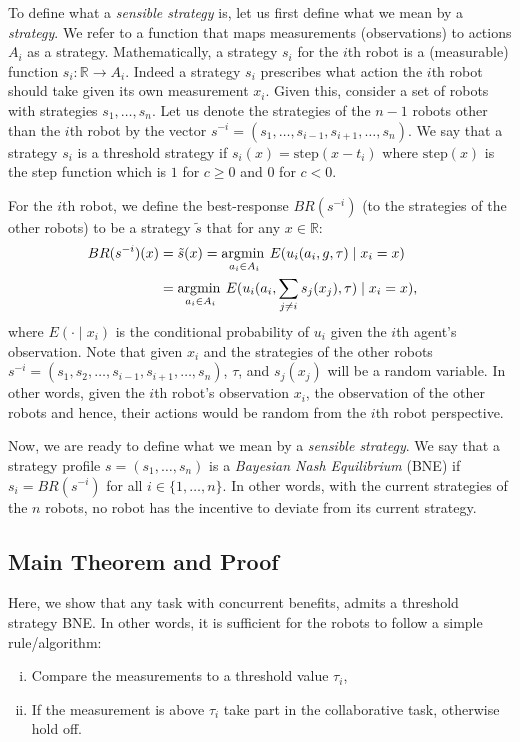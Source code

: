 \documentclass[conference]{ieeeconf}
\DeclareMathOperator*{\argmax}{\arg\!\min\>}
\def\R{\mathbb{R}}
\begin{document}
To define what a \textit{sensible strategy} is, let us first define what we mean by a \textit{strategy}. We refer to a function that maps measurements (observations) to actions $A_i$ as a strategy. Mathematically, a strategy $s_i$ for the $i$th robot is a (measurable) function $s_i:\R\to A_i$. Indeed a strategy $s_i$ prescribes what action the $i$th robot should take given its own measurement $x_i$. Given this, consider a set of robots with strategies $s_1,\ldots,s_n$. Let us denote the strategies of the $n-1$ robots other than the $i$th robot by the vector $s^{-i}=(s_1,\ldots,s_{i-1},s_{i+1},\ldots,s_n)$.  We say that a strategy $s_i$ is a threshold strategy if $s_i(x)=\text{step}(x-t_i)$ where $\text{step}(x)$ is the step function which is $1$ for $c\geq 0$ and $0$ for $c<0$.


For the $i$th robot, we define the best-response $BR(s^{-i})$ (to the strategies of the other robots) to be a strategy $\tilde{s}$ that for any $x\in \R$: 
\begin{align*}\label{eqn:BR}
BR(s^{-i})(x)&=\tilde{s}(x)=\argmax_{a_i\in A_i} E(u_i(a_i,g,\tau)\mid x_i=x)\cr 
&=\argmax_{a_i\in A_i} E(u_i(a_i,\sum_{j\not=i}s_j(x_j),\tau)\mid x_i=x),
\end{align*}
where $E(\cdot \mid x_i)$ is the conditional probability of $u_i$ given the $i$th agent's observation. Note that given $x_i$ and the strategies of the other robots $s^{-i}=(s_1,s_2,\ldots,s_{i-1},s_{i+1},\ldots,s_n)$, $\tau$, and $s_j(x_j)$ will be a random variable. In other words, given the $i$th robot's observation $x_i$, the observation of the other robots and hence, their actions would be random from the $i$th robot perspective.


Now, we are ready to define what we mean by a \textit{sensible strategy}. We say that a strategy profile $s=(s_1,\ldots,s_n)$ is a \textit{Bayesian Nash Equilibrium} (BNE) \cite{fudenberg1998theory} if $s_i=BR(s^{-i})$ for all $i\in \{1,\ldots,n\}$. In other words, with the current strategies of the $n$ robots, no robot has the incentive to deviate from its current strategy.

\subsection{Main Theorem and Proof}\label{sec:thmproof}
Here, we show that any task with concurrent benefits, admits a threshold strategy BNE. In other words, it is sufficient for the robots to follow a simple rule/algorithm: 
\begin{enumerate}[(i)]
\item Compare the measurements to a threshold value $\tau_i$,
\item If the measurement is above $\tau_i$ take part in the collaborative task, otherwise hold off. 
\end{enumerate}
\end{document}
